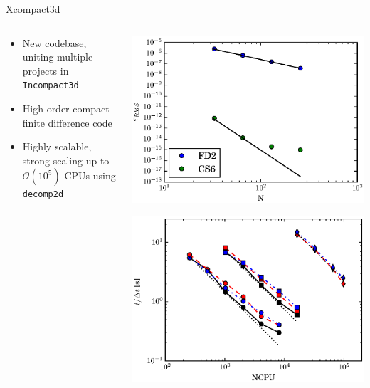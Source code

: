 \documentclass[presentation]{beamer}
\begin{document}
\begin{frame}[label={sec:orgc470ebc},fragile]{Xcompact3d}
 \begin{columns}
\begin{column}{0.5\columnwidth}
\begin{itemize}
\item New codebase, uniting multiple projects in \texttt{Incompact3d}
\item High-order compact finite difference code
\item Highly scalable, strong scaling up to \(\mathcal{O}\left(10^{5}\right)\) CPUs using \texttt{decomp2d}
\end{itemize}
\end{column}

\begin{column}{0.5\columnwidth}
\begin{center}
\includegraphics[width=0.8\columnwidth]{./figures/convergence-tgv2d.eps}
\end{center}

\begin{center}
\includegraphics[width=0.8\columnwidth]{./figures/x3d-scaling.eps}
\end{center}
\end{column}
\end{columns}
\end{frame}
\end{document}
